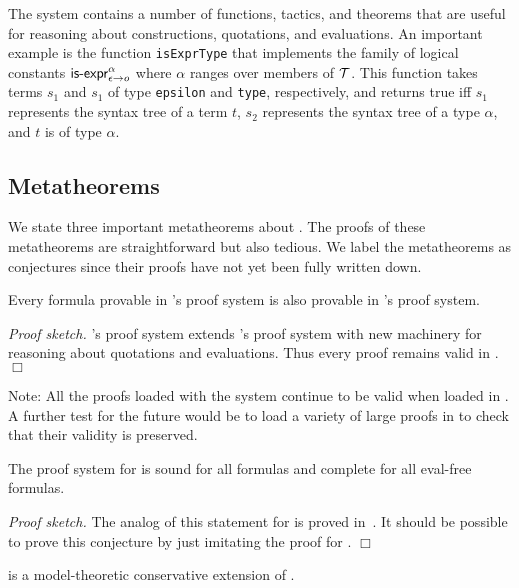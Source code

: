 \documentclass[fleqn]{llncs}
\begin{document}
The {\HLQE} system contains a number of {\HOL} functions, tactics, and
theorems that are useful for reasoning about constructions,
quotations, and evaluations.  An important example is the {\HOL}
function \texttt{isExprType} that implements the {\churchqe} family of
logical constants $\mbox{\sf is-expr}_{\epsilon \rightarrow o}^{\alpha}$
where $\alpha$ ranges over members of $\mbox{$\cal T$}$.  This function takes
terms $s_1$ and $s_1$ of type \texttt{epsilon} and \texttt{type},
respectively, and returns true iff $s_1$ represents the syntax tree of
a term $t$, $s_2$ represents the syntax tree of a type $\alpha$, and
$t$ is of type $\alpha$.

\subsection{Metatheorems}

We state three important metatheorems about {\HLQE}.  The proofs of
these metatheorems are straightforward but also tedious.  We label the
metatheorems as conjectures since their proofs have not yet been fully
written down.

\begin{conjecture}\bsp
Every formula provable in {\HL}'s proof system is also provable in
{\HLQE}'s proof system.\esp
\end{conjecture}

\noindent
\emph{Proof sketch.}  {\HLQE}'s proof system extends {\HL}'s proof
system with new machinery for reasoning about quotations and
evaluations. Thus every {\HL} proof remains valid in {\HLQE}. $\Box$

\bigskip

\noindent
Note: All the proofs loaded with the {\HL} system continue to be valid
when loaded in {\HLQE}.  A further test for the future would be to
load a variety of large {\HL} proofs in {\HLQE} to check that their
validity is preserved.

\begin{conjecture}
The proof system for {\HLQE} is sound for all formulas and complete
for all eval-free formulas.
\end{conjecture}

\noindent
\emph{Proof sketch.}  The analog of this statement for {\churchqe} is
proved in~\cite{Farmer18}.  It should be possible to prove this
conjecture by just imitating the proof for {\churchqe}. $\Box$

\begin{conjecture}\bsp
{\HLQE} is a model-theoretic conservative extension of {\HL}.\esp
\end{conjecture}
\end{document}

